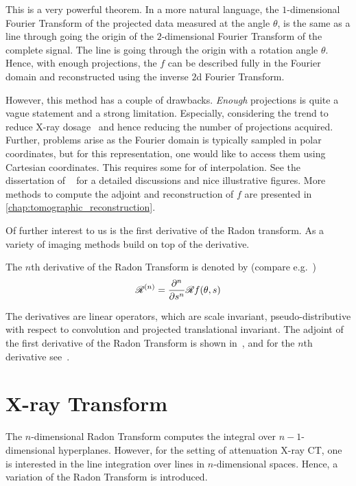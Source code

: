 This is a very powerful theorem. In a more natural language, the \(1\)-dimensional Fourier Transform
of the projected data measured at the angle \(\theta\), is the same as a line through going the
origin of the \(2\)-dimensional Fourier Transform of the complete signal. The line is going through
the origin with a rotation angle \(\theta\). Hence, with enough projections, the \(f\) can be
described fully in the Fourier domain and reconstructed using the inverse \(2\)d Fourier Transform.

However, this method has a couple of drawbacks. \textit{Enough} projections is quite a vague
statement and a strong limitation. Especially, considering the trend to reduce X-ray
dosage~\cite{kalender_dose_2014} and hence reducing the number of projections acquired. Further,
problems arise as the Fourier domain is typically sampled in polar coordinates, but for this
representation, one would like to access them using Cartesian coordinates. This requires some for of
interpolation. See the dissertation of
\citeauthor{vogel_tomographic_2015}~\cite[Chapter~4.1.2]{vogel_tomographic_2015} for a detailed
discussions and nice illustrative figures. More methods to compute the adjoint and reconstruction of
\(f\) are presented in \autoref{chap:tomographic_reconstruction}.

Of further interest to us is the first derivative of the Radon transform. As a variety of imaging
methods build on top of the derivative.

\begin{definition}
	The \(n\)th derivative of the Radon Transform is denoted by (compare
	e.g.\ \cite{nilchian_differential_2012,nilchian_fast_2013})
	\[ \mathscr{R}^{(n)} = \frac{\partial^n}{\partial s^n} \mathscr{R} f(\theta, s)\]
\end{definition}

The derivatives are linear operators, which are scale invariant, pseudo-distributive with respect to
convolution and projected translational invariant. The adjoint of the first derivative of the Radon
Transform is shown in~\cite{nilchian_differential_2012}, and for the \(n\)th derivative
see~\cite{nilchian_fast_2013}.

\section{X-ray Transform}\label{sec:xray_transform}

The \(n\)-dimensional Radon Transform computes the integral over \(n-1\)-dimensional hyperplanes.
However, for the setting of attenuation X-ray CT, one is interested in the line integration over
lines in \(n\)-dimensional spaces. Hence, a variation of the Radon Transform is introduced.

